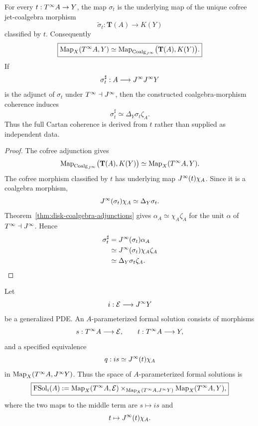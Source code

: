 \begin{theorem}
\label{thm:formal-holonomicity-coalgebraic}
For every $t:T^{\infty} A\to Y$, the map $\sigma_t$ is the underlying map of the unique cofree jet-coalgebra morphism
\[
    \widetilde\sigma_t:\mathbf T(A)\longrightarrow K(Y)
\]
classified by $t$.  Consequently
\[
\boxed{
    \operatorname{Map}_X(T^{\infty} A,Y)
    \simeq
    \operatorname{Map}_{\operatorname{Coalg}_{J^{\infty}}}\bigl(\mathbf T(A),K(Y)\bigr).
}
\]
If
\[
    \sigma_t^\sharp:A\longrightarrow J^{\infty}J^{\infty} Y
\]
is the adjunct of $\sigma_t$ under $T^{\infty}\dashv J^{\infty}$, then the constructed coalgebra-morphism coherence induces
\[
    \boxed{
    \sigma_t^\sharp
    \simeq
    \Delta_Y\sigma_t\zeta_A.
    }
\]
Thus the full Cartan coherence is derived from $t$ rather than supplied as independent data.
\end{theorem}

\begin{proof}
The cofree adjunction gives
\[
    \operatorname{Map}_{\operatorname{Coalg}_{J^{\infty}}}\bigl(\mathbf T(A),K(Y)\bigr)
    \simeq
    \operatorname{Map}_X(T^{\infty} A,Y).
\]
The cofree morphism classified by $t$ has underlying map $J^{\infty}(t)\chi_A$.  Since it is a coalgebra morphism,
\[
    J^{\infty}(\sigma_t)\chi_A\simeq\Delta_Y\sigma_t.
\]
Theorem~\ref{thm:disk-coalgebra-adjunctions} gives $\alpha_A\simeq\chi_A\zeta_A$ for the unit $\alpha$ of $T^{\infty}\dashv J^{\infty}$.  Hence
\[
\begin{aligned}
\sigma_t^\sharp
&=
J^{\infty}(\sigma_t)\alpha_A\\
&\simeq
J^{\infty}(\sigma_t)\chi_A\zeta_A\\
&\simeq
\Delta_Y\sigma_t\zeta_A.
\end{aligned}
\]
\end{proof}

\begin{definition}
\label{def:parameterized-formal-solution}
Let
\[
    i:\mathcal E\longrightarrow J^{\infty} Y
\]
be a generalized PDE.  An $A$-parameterized formal solution consists of morphisms
\[
    s:T^{\infty} A\longrightarrow\mathcal E,
    \qquad
    t:T^{\infty} A\longrightarrow Y,
\]
and a specified equivalence
\[
    q:is\simeq J^{\infty}(t)\chi_A
\]
in $\operatorname{Map}_X(T^{\infty} A,J^{\infty} Y)$.  Thus the space of $A$-parameterized formal solutions is
\[
\boxed{
    \operatorname{FSol}_i(A)
    :=
    \operatorname{Map}_X(T^{\infty} A,\mathcal E)
    \times_{\operatorname{Map}_X(T^{\infty} A,J^{\infty} Y)}
    \operatorname{Map}_X(T^{\infty} A,Y),
}
\]
where the two maps to the middle term are $s\mapsto is$ and
\[
    t\mapsto J^{\infty}(t)\chi_A.
\]
\end{definition}

